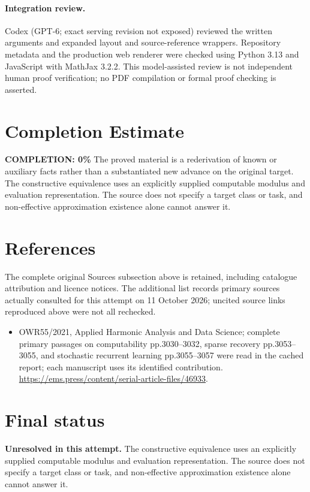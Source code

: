 \documentclass[11pt]{article}
\begin{document}
\paragraph{Integration review.} Codex (GPT-6; exact serving revision not exposed) reviewed the written arguments and expanded layout and source-reference wrappers. Repository metadata and the production web renderer were checked using Python 3.13 and JavaScript with MathJax 3.2.2. This model-assisted review is not independent human proof verification; no PDF compilation or formal proof checking is asserted.

\section{Completion Estimate}
\noindent\textbf{COMPLETION: 0\%}
The proved material is a rederivation of known or auxiliary facts rather than a substantiated new advance on the original target. The constructive equivalence uses an explicitly supplied computable modulus and evaluation representation. The source does not specify a target class or task, and non-effective approximation existence alone cannot answer it.
\section{References}
The complete original Sources subsection above is retained, including catalogue attribution and licence notices. The additional list records primary sources actually consulted for this attempt on 11 October 2026; uncited source links reproduced above were not all rechecked.
\begin{itemize}
\item OWR55/2021, Applied Harmonic Analysis and Data Science; complete primary passages on computability pp.3030–3032, sparse recovery pp.3053–3055, and stochastic recurrent learning pp.3055–3057 were read in the cached report; each manuscript uses its identified contribution. \url{https://ems.press/content/serial-article-files/46933}.
\end{itemize}
\section{Final status}
\textbf{Unresolved in this attempt.} The constructive equivalence uses an explicitly supplied computable modulus and evaluation representation. The source does not specify a target class or task, and non-effective approximation existence alone cannot answer it.
\end{document}
